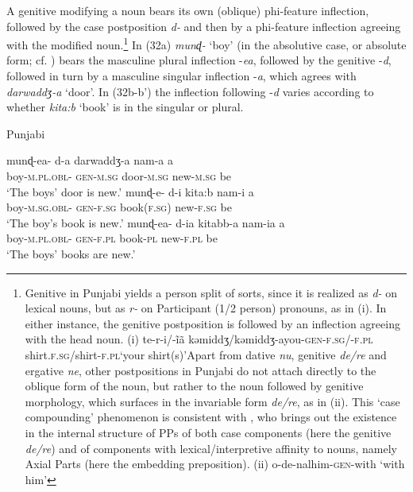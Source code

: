 \documentclass[output=paper]{langsci/langscibook}
\begin{document}
A genitive modifying a noun bears its own (oblique) phi-feature inflection, followed by the case postposition \textit{d-} and then by a phi-feature inflection agreeing with the modified noun.\footnote{Genitive in Punjabi yields a person split of sorts, since it is realized as \textit{d-} on lexical nouns, but as \textit{r-} on Participant (1/2 person) pronouns, as in (i). In either instance, the genitive postposition is followed by an inflection agreeing with the head noun. (i)    te-r-i/-ĩã    kəmiddʒ/kəmiddʒ-ayou-\textsc{gen-f.sg/-f.pl}  shirt.\textsc{f.sg}/shirt-\textsc{f.pl}‘your shirt(s)’Apart from dative \textit{nu}, genitive \textit{de/re} and ergative \textit{ne}, other postpositions in Punjabi do not attach directly to the oblique form of the noun, but rather to the noun followed by genitive morphology, which surfaces in the invariable form \textit{de/re}, as in (ii). This ‘case compounding’ phenomenon is consistent with \citet{Svenonius2006}, who brings out the existence in the internal structure of PPs of both case components (here the genitive \textit{de/re}) and of components with lexical/interpretive affinity to nouns, namely Axial Parts (here the embedding preposition). (ii)    o-de-nalhim-\textsc{gen}{}-with   ‘with him’} In (32a) \textit{munɖ-} ‘boy’ (in the absolutive case, or absolute form; cf. \citealt{Bailey1904}) bears the masculine plural inflection -\textit{ea}, followed by the genitive -\textit{d}, followed in turn by a masculine singular inflection -\textit{a}, which agrees with \textit{darwaddʒ-a} ‘door’. In (32b-b’) the inflection following -\textit{d} varies according to whether \textit{kita:b} ‘book’ is in the singular or plural. 

\ea%
    Punjabi\label{ex:manzini:32}\\
    \begin{xlista}
    \ex
    \gll munɖ-ea-    d-a     darwaddʒ-a   nam-a   a\\
         boy-\textsc{m.pl.obl-  gen-m.sg}  door-\textsc{m.sg}  new-\textsc{m.sg}    be\\
    \glt ‘The boys’ door is new.’
    \ex  
    \gll munɖ-e-    d-i     kita:b     nam-i     a\\
         boy-\textsc{m.sg.obl-  gen-f.sg}   book(\textsc{f.sg)}   new-\textsc{f.sg}   be\\
    \glt ‘The boy’s book is new.’
    \gll munɖ-ea-    d-ia     kitabb-a   nam-ia   a\\
         boy-\textsc{m.pl.obl-  gen-f.pl}   book-\textsc{pl}   new-\textsc{f.pl}   be\\
    \glt ‘The boys’ books are new.’ 
    \end{xlista}
    \z
\end{document}
